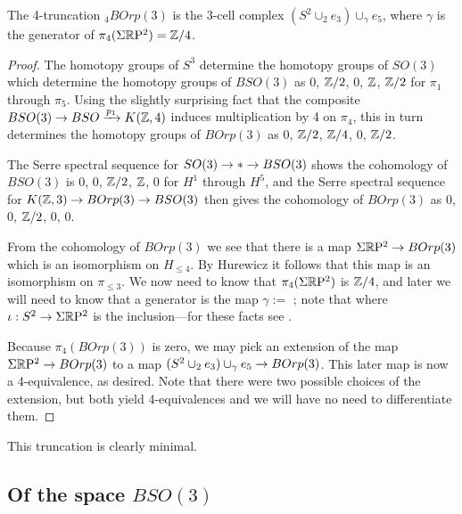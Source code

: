 \documentclass{amsart}
\begin{document}
\begin{proposition}
The 4-truncation $_4 BOrp(3)$ is the 3-cell complex $(S^2 \cup_2 e_3) \cup_\gamma e_5$, where $\gamma$ is the generator of $\pi_4(\Sigma \mathbb R \mathrm{P}^2) = \mathbb Z/4$.  
\end{proposition}
\begin{proof}
The homotopy groups of $S^3$ determine the homotopy groups of $SO(3)$ which determine the homotopy groups of $BSO(3)$ as $0$, $\mathbb Z/2$, $0$, $\mathbb Z$, $\mathbb Z/2$ for $\pi_1$ through $\pi_5$.  Using the slightly surprising fact that the composite $BSO(3) \rightarrow BSO \xrightarrow{p_1} K(\mathbb Z,4)$ induces multiplication by 4 on $\pi_4$, this in turn determines the homotopy groups of $BOrp(3)$ as $0$, $\mathbb Z/2$, $\mathbb Z/4$, $0$, $\mathbb Z/2$.  

The Serre spectral sequence for $SO(3) \rightarrow * \rightarrow BSO(3)$ shows the cohomology of $BSO(3)$ is $0$, $0$, $\mathbb Z/2$, $\mathbb Z$, $0$ for $H^1$ through $H^5$, and the Serre spectral sequence for $K(\mathbb Z,3) \rightarrow BOrp(3) \rightarrow BSO(3)$ then gives the cohomology of $BOrp(3)$ as $0$, $0$, $\mathbb Z/2$, $0$, $0$.

From the cohomology of $BOrp(3)$ we see that there is a map $\Sigma \mathbb R \mathrm{P}^2 \rightarrow BOrp(3)$ which is an isomorphism on $H_{\leq 4}$.  By Hurewicz it follows that this map is an isomorphism on $\pi_{\leq 3}$.  We now need to know that $\pi_4(\Sigma \mathbb R \mathrm{P}^2)$ is $\mathbb Z/4$, and later we will need to know that a generator is the map $\gamma :=$ ; note that  where $\iota: S^2 \rightarrow \Sigma \mathbb R \mathrm{P}^2$ is the inclusion---for these facts see .  

Because $\pi_4(BOrp(3))$ is zero, we may pick an extension of the map $\Sigma \mathbb R \mathrm{P}^2 \rightarrow BOrp(3)$ to a map $(S^2 \cup_2 e_3) \cup_\gamma e_5 \rightarrow BOrp(3)$.  This later map is now a 4-equivalence, as desired.  Note that there were two possible choices of the extension, but both yield 4-equivalences and we will have no need to differentiate them.
\end{proof}

\nid This truncation is clearly minimal. 

\subsection{Of the space $BSO(3)$}
\end{document}
